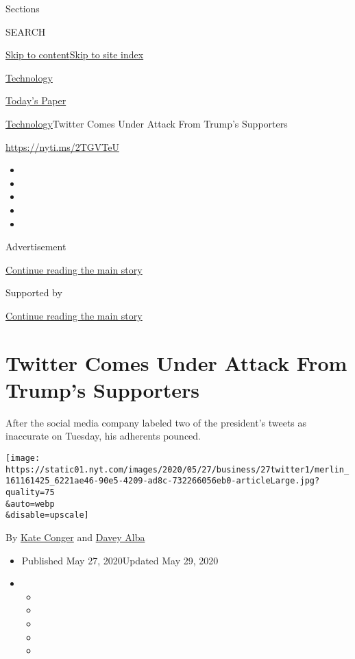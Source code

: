 Sections

SEARCH

\protect\hyperlink{site-content}{Skip to
content}\protect\hyperlink{site-index}{Skip to site index}

\href{https://www.nytimes.com/section/technology}{Technology}

\href{https://myaccount.nytimes.com/auth/login?response_type=cookie\&client_id=vi}{}

\href{https://www.nytimes.com/section/todayspaper}{Today's Paper}

\href{/section/technology}{Technology}\textbar{}Twitter Comes Under
Attack From Trump's Supporters

\url{https://nyti.ms/2TGVTeU}

\begin{itemize}
\item
\item
\item
\item
\item
\end{itemize}

Advertisement

\protect\hyperlink{after-top}{Continue reading the main story}

Supported by

\protect\hyperlink{after-sponsor}{Continue reading the main story}

\hypertarget{twitter-comes-under-attack-from-trumps-supporters}{%
\section{Twitter Comes Under Attack From Trump's
Supporters}\label{twitter-comes-under-attack-from-trumps-supporters}}

After the social media company labeled two of the president's tweets as
inaccurate on Tuesday, his adherents pounced.

\texttt{[image: https://static01.nyt.com/images/2020/05/27/business/27twitter1/merlin\_161161425\_6221ae46-90e5-4209-ad8c-732266056eb0-articleLarge.jpg?quality=75\\\&auto=webp\\\&disable=upscale]}

By \href{https://www.nytimes.com/by/kate-conger}{Kate Conger} and
\href{https://www.nytimes.com/by/davey-alba}{Davey Alba}

\begin{itemize}
\item
  Published May 27, 2020Updated May 29, 2020
\item
  \begin{itemize}
  \item
  \item
  \item
  \item
  \item
  \end{itemize}
\end{itemize}

